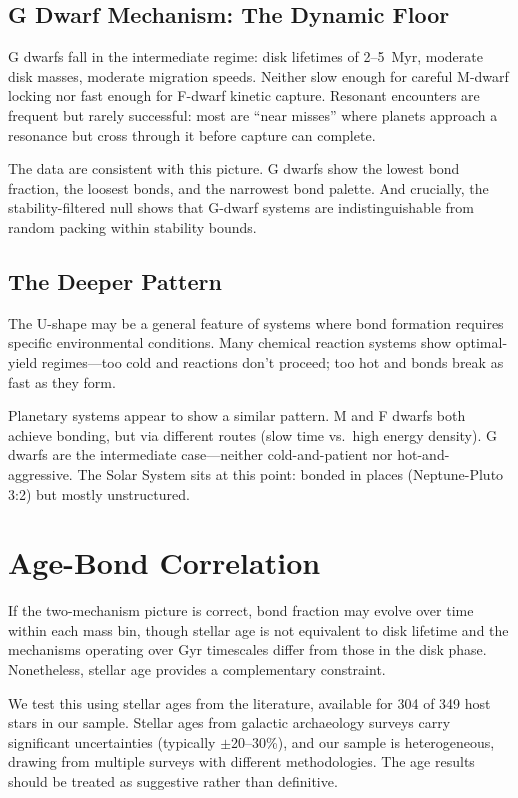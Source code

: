 \documentclass[twocolumn]{aastex631}
\begin{document}
\subsection{G Dwarf Mechanism: The Dynamic Floor}

G dwarfs fall in the intermediate regime: disk lifetimes of 2--5~Myr, moderate
disk masses, moderate migration speeds. Neither slow enough for careful M-dwarf
locking nor fast enough for F-dwarf kinetic capture. Resonant encounters are
frequent but rarely successful: most are ``near misses'' where planets approach
a resonance but cross through it before capture can complete.

The data are consistent with this picture. G dwarfs show the lowest bond
fraction, the loosest bonds, and the narrowest bond palette. And crucially, the
stability-filtered null shows that G-dwarf systems are indistinguishable from
random packing within stability bounds.

\subsection{The Deeper Pattern}

The U-shape may be a general feature of systems where bond formation requires
specific environmental conditions. Many chemical reaction systems show
optimal-yield regimes---too cold and reactions don't proceed; too hot and
bonds break as fast as they form.

Planetary systems appear to show a similar pattern. M and F dwarfs both achieve
bonding, but via different routes (slow time vs.\ high energy density). G dwarfs
are the intermediate case---neither cold-and-patient nor hot-and-aggressive.
The Solar System sits at this point: bonded in places (Neptune-Pluto 3:2) but
mostly unstructured.

\section{Age-Bond Correlation}
\label{sec:agebond}

If the two-mechanism picture is correct, bond fraction may evolve over time
within each mass bin, though stellar age is not equivalent to disk lifetime and
the mechanisms operating over Gyr timescales differ from those in the disk
phase. Nonetheless, stellar age provides a complementary constraint.

We test this using stellar ages from the literature\citep{galactic_archaeology},
available for 304 of 349 host stars in our sample. Stellar ages from
galactic archaeology surveys carry significant uncertainties (typically
$\pm$20--30\%), and our sample is heterogeneous, drawing from multiple surveys
with different methodologies. The age results should be treated as suggestive
rather than definitive.
\end{document}
